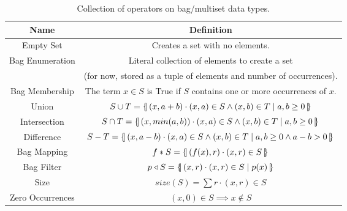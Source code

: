 \documentclass{article}
\newcommand{\bSetT}[2]{%
  \{\, #1 \cdot #2 \,\}%
}
\newcommand{\lbbar}{\{\kern-0.5ex|}
\newcommand{\rbbar}{|\kern-0.5ex\}}
\newcommand{\bag}[3]{%
  \lbbar \, #1 \cdot #2 \mid #3 \, \rbbar%
}
\newcommand{\bagT}[2]{%
  \lbbar \, #1 \cdot #2 \,\rbbar%
}
\begin{document}
\begin{table}[H]
    \centering
    \caption{Collection of operators on bag/multiset data types.}
    \begin{tabular}{|c|c|}
        \hline
        Name & Definition \\ %
        \hline
        Empty Set & Creates a set with no elements.\\ %
        Bag Enumeration & Literal collection of elements to create a set \\ & (for now, stored as a tuple of elements and number of occurrences).\\ %
        Bag Membership & The term $x \in S$ is True if $S$ contains one or more occurrences of $x$. \\ %
        \hline
        Union & $S \cup T = \bag{(x, a+b)}{(x,a) \in S \land (x,b) \in T}{a, b \geq 0}$ \\ %
        Intersection & $S \cap T = \bag{(x, min(a,b))}{(x,a) \in S \land (x,b) \in T}{a, b \geq 0}$ \\ %
        Difference & $S - T = \bag{(x, a-b)}{(x,a) \in S \land (x,b) \in T}{a, b \geq 0 \land a-b > 0}$ \\ %
        Bag Mapping & $f * S = \bagT{(f(x), r)}{(x, r) \in S}$\\ %
        Bag Filter & $p \triangleleft S = \bag{(x, r)}{(x, r) \in S}{p(x)}$\\ %
        Size & $size(S) = \sum r \cdot (x, r) \in S$\\
        Zero Occurrences & $(x,0) \in S \implies x \notin S$\\
        \hline
    \end{tabular}
    \label{tab:setOps}
\end{table}
\end{document}
